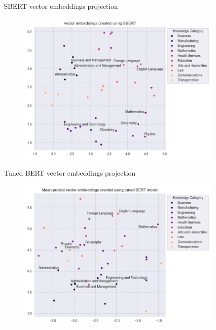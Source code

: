 \documentclass{beamer}
\begin{document}
\begin{frame}{SBERT vector embeddings projection}
  \begin{figure}[ht!]
    \centering
    \includegraphics[width=0.9\textwidth]{../plots/base_sbert.png}
\end{figure}

\end{frame}


\begin{frame}{Tuned BERT vector embeddings projection}
  \begin{figure}[ht!]
    \centering
    \includegraphics[width=0.9\textwidth]{../plots/tuned_bert.png}
\end{figure}

\end{frame}
\end{document}
